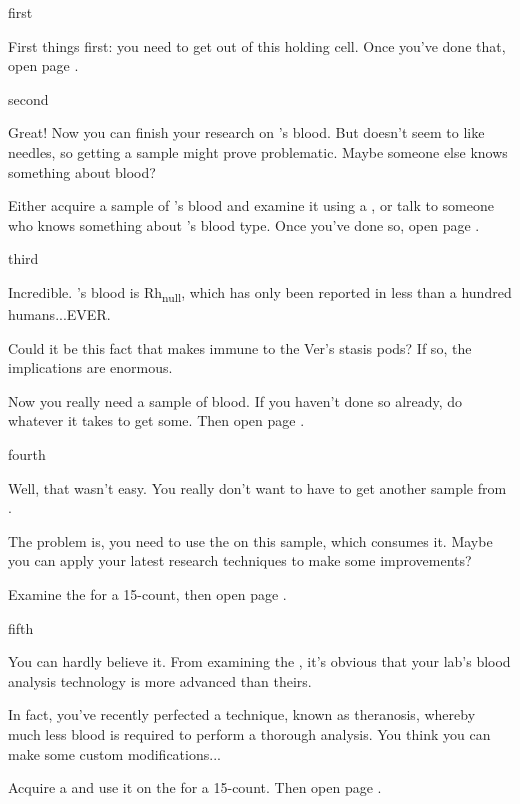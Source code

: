 \documentclass[greennotebook]{guildcamp4} %
\begin{document}
\startnotebook{\nSpiteNotebook{}}

\begin{page}{first}

First things first: you need to get out of this holding cell. Once you've done that, open page .

\end{page}

\begin{page}{second}

Great! Now you can finish your research on \cPlead{}'s blood. But  doesn't seem to like needles, so getting a sample might prove problematic. Maybe someone else knows something about  blood?

Either acquire a sample of \cPlead{}'s blood and examine it using a \iMicroscope{}, or talk to someone who knows something about \cPlead{}'s blood type. Once you've done so, open page .

\end{page}

\begin{page}{third}

Incredible. \cPlead{}'s blood is Rh\textsubscript{null}, which has only been reported in less than a hundred humans...EVER.

Could it be this fact that makes \cPlead{} immune to the Ver's stasis pods? If so, the implications are enormous.

Now you really need a sample of  blood. If you haven't done so already, do whatever it takes to get some. Then open page .

\end{page}

\begin{page}{fourth}

Well, that wasn't easy. You really don't want to have to get another sample from \cPlead{}. 

The problem is, you need to use the \sBloodAnalyzer{} on this sample, which consumes it. Maybe you can apply your latest research techniques to make some improvements?

Examine the \sBloodAnalyzer{} for a 15-count, then open page .

\end{page}

\begin{page}{fifth}

You can hardly believe it. From examining the \sBloodAnalyzer{}, it's obvious that your lab's blood analysis technology is more advanced than theirs.

In fact, you've recently perfected a technique, known as theranosis, whereby much less blood is required to perform a thorough analysis. You think you can make some custom modifications...

Acquire a \iWrench{} and use it on the \sBloodAnalyzer{} for a 15-count. Then open page .

\end{page}
\end{document}
